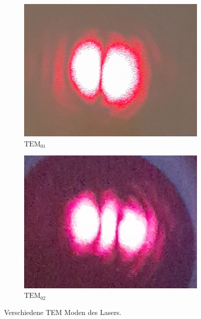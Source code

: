 \begin{figure}
  \begin{subfigure}{.45\textwidth}
    \centering 
    \includegraphics[width = \textwidth]{content/pics/TEM01.jpg}
    \caption{$\text{TEM}_{01}$}
    \label{fig:TEM01_pic}
  \end{subfigure}
  \hfill
  \begin{subfigure}{.45\textwidth}
    \centering 
    \includegraphics[width = \textwidth]{"content/pics/TEM02.jpg"}
    \caption{$\text{TEM}_{02}$}
    \label{fig:TEM02_pic}
  \end{subfigure}
  \caption{Verschiedene TEM Moden des Lasers.}
  \label{fig:TEM_Modes}
\end{figure}

